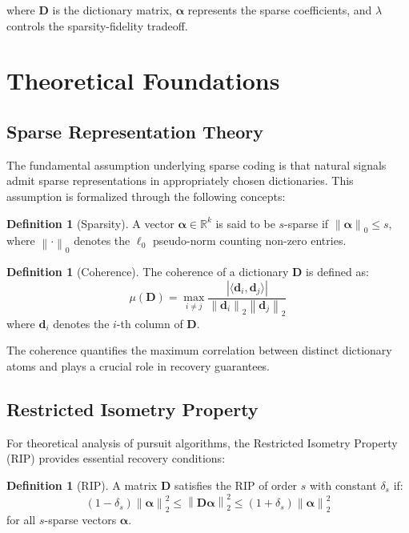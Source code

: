 \documentclass[12pt]{article}
\renewcommand{\vec}[1]{\mathbf{#1}}
\newcommand{\norm}[1]{\left\|#1\right\|}
\newcommand{\inner}[2]{\langle #1, #2 \rangle}
\theoremstyle{definition}
\newtheorem{definition}[theorem]{Definition}
\begin{document}
where $\mathbf{D}$ is the dictionary matrix, $\vec{\alpha}$ represents the sparse coefficients, and $\lambda$ controls the sparsity-fidelity tradeoff.

\newpage

\section{Theoretical Foundations}
\label{sec:theoretical_foundations}

\subsection{Sparse Representation Theory}
\label{subsec:sparse_representation}

The fundamental assumption underlying sparse coding is that natural signals admit sparse representations in appropriately chosen dictionaries. This assumption is formalized through the following concepts:

\begin{definition}[Sparsity]
    A vector $\vec{\alpha} \in \mathbb{R}^k$ is said to be $s$-sparse if $\norm{\vec{\alpha}}_0 \leq s$, where $\norm{\cdot}_0$ denotes the $\ell_0$ pseudo-norm counting non-zero entries.
\end{definition}

\begin{definition}[Coherence]
    The coherence of a dictionary $\mathbf{D}$ is defined as:
    \begin{equation}
        \mu(\mathbf{D}) = \max_{i \neq j} \frac{|\inner{\vec{d}_i}{\vec{d}_j}|}{\norm{\vec{d}_i}_2 \norm{\vec{d}_j}_2}
    \end{equation}
    where $\vec{d}_i$ denotes the $i$-th column of $\mathbf{D}$.
\end{definition}

The coherence quantifies the maximum correlation between distinct dictionary atoms and plays a crucial role in recovery guarantees.

\subsection{Restricted Isometry Property}
\label{subsec:rip}

For theoretical analysis of pursuit algorithms, the Restricted Isometry Property (RIP) provides essential recovery conditions:

\begin{definition}[RIP]
    A matrix $\mathbf{D}$ satisfies the RIP of order $s$ with constant $\delta_s$ if:
    \begin{equation}
        (1 - \delta_s)\norm{\vec{\alpha}}_2^2 \leq \norm{\mathbf{D}\vec{\alpha}}_2^2 \leq (1 + \delta_s)\norm{\vec{\alpha}}_2^2
    \end{equation}
    for all $s$-sparse vectors $\vec{\alpha}$.
\end{definition}
\end{document}

